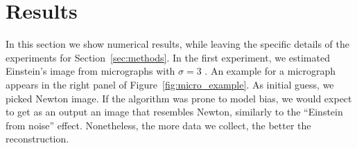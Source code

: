 \documentclass[english,11pt]{article}
\newcommand{\TODO}[1]{{\color{red}{[#1]}}}
\numberwithin{equation}{section}
\theoremstyle{plain}
\theoremstyle{definition}
\theoremstyle{remark}
\theoremstyle{plain}
\theoremstyle{remark}
\theoremstyle{plain}
\theoremstyle{plain}
\begin{document}
\section{Results}


\TODO{Revise to explain $K = 1$ experiment first, then explain $K = 3$.}
\TODO{TB: we should remove the ``long estimation" from the plots}

In this section we show numerical results, while leaving the specific details of the experiments for Section~\ref{sec:methods}. In the first experiment, we estimated Einstein's image from micrographs with $\sigma=3$ . An example for a micrograph appears in the right panel of Figure~\ref{fig:micro_example}. As initial guess, we picked Newton image. If the algorithm was prone to model bias, we would expect to get as an output an image that resembles Newton, similarly to the ``Einstein from noise'' effect. Nonetheless, the more data we collect, the better the reconstruction.\TODO{We have a movie in the supplementary material.}
\end{document}
